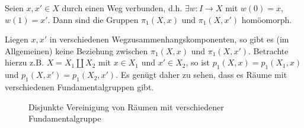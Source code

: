 
\begin{theorem}\label{thm:pi-1-ist-gleich-auf-wegusammenhangskomponente}
    Seien $x,x' \in X$ durch einen Weg verbunden, d.h. $\exists w\colon  I \to X$ mit $w(0) = x$,  $w(1) = x'$. Dann sind die Gruppen  $\pi_1(X,x)$ und $\pi_1(X,x')$ homöomorph.
\end{theorem}

\begin{remark}
    Liegen $x,x'$ in verschiedenen Wegzusammenhangskomponenten, so gibt es (im Allgemeinen) keine Beziehung zwischen  $\pi_1(X,x)$ und $\pi_1(X,x')$. Betrachte hierzu z.B. $X = X_1 \coprod X_2$ mit $x\in X_1$ und $x' \in X_2$, so ist $p_1(X,x) = p_1(X_1,x)$ und $p_1(X,x') = p_1(X_2,x')$. Es genügt daher zu sehen, dass es Räume mit verschiedenen Fundamentalgruppen gibt.
\end{remark}

\begin{figure}[ht]
    \centering
    \caption{Disjunkte Vereinigung von Räumen mit verschiedener Fundamentalgruppe}
    \label{fig:disjunkte-vereinigung-von-räumen-mit-verschiedener-fundamentalgruppe}
\end{figure}

